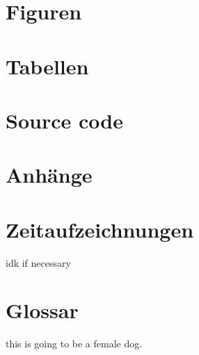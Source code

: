 \documentclass[letterpaper, 12pt]{article}
\begin{document}
\parindent 0pt
\parskip 6pt



\clearpage
\tableofcontents
\clearpage



 
\clearpage
{}
\pagestyle{fancy}






\lfoot{}

\clearpage
\begingroup


\endgroup

\clearpage
\begin{appendices}
	\section{Figuren}
		\makeatletter
		\makeatother
	\section{Tabellen}
		\makeatletter
		\makeatother
	\section{Source code}
		\makeatletter
		\makeatother
	\section{Anhänge}
		
	\section{Zeitaufzeichnungen}
		\todo{} idk if necessary
	\section{Glossar}
		\todo{} this is going to be a female dog.
\end{appendices}
\end{document}
